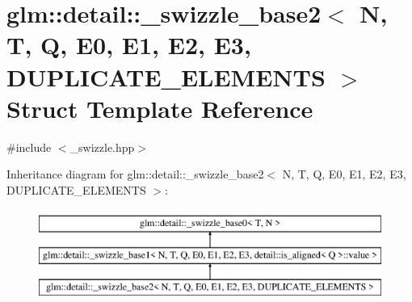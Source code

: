\hypertarget{structglm_1_1detail_1_1__swizzle__base2}{}\section{glm\+:\+:detail\+:\+:\+\_\+swizzle\+\_\+base2$<$ N, T, Q, E0, E1, E2, E3, D\+U\+P\+L\+I\+C\+A\+T\+E\+\_\+\+E\+L\+E\+M\+E\+N\+TS $>$ Struct Template Reference}
\label{structglm_1_1detail_1_1__swizzle__base2}


{\ttfamily \#include $<$\+\_\+swizzle.\+hpp$>$}

Inheritance diagram for glm\+:\+:detail\+:\+:\+\_\+swizzle\+\_\+base2$<$ N, T, Q, E0, E1, E2, E3, D\+U\+P\+L\+I\+C\+A\+T\+E\+\_\+\+E\+L\+E\+M\+E\+N\+TS $>$\+:\begin{figure}[H]
\begin{center}
\leavevmode
\includegraphics[height=3.000000cm]{structglm_1_1detail_1_1__swizzle__base2}
\end{center}
\end{figure}
